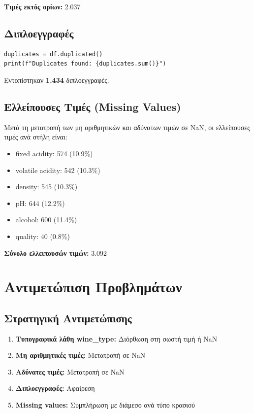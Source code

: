 \documentclass[12pt,a4paper]{article}
\begin{document}
\textbf{Τιμές εκτός ορίων:} 2.037

\subsection{Διπλοεγγραφές}

\begin{lstlisting}
duplicates = df.duplicated()
print(f"Duplicates found: {duplicates.sum()}")
\end{lstlisting}

Εντοπίστηκαν \textbf{1.434} διπλοεγγραφές.

\subsection{Ελλείπουσες Τιμές (Missing Values)}

Μετά τη μετατροπή των μη αριθμητικών και αδύνατων τιμών σε NaN, οι ελλείπουσες τιμές ανά στήλη είναι:

\begin{itemize}
    \item fixed acidity: 574 (10.9\%)
    \item volatile acidity: 542 (10.3\%)
    \item density: 545 (10.3\%)
    \item pH: 644 (12.2\%)
    \item alcohol: 600 (11.4\%)
    \item quality: 40 (0.8\%)
\end{itemize}

\textbf{Σύνολο ελλειπουσών τιμών:} 3.092

\section{Αντιμετώπιση Προβλημάτων}

\subsection{Στρατηγική Αντιμετώπισης}

\begin{enumerate}
    \item \textbf{Τυπογραφικά λάθη wine\_type:} Διόρθωση στη σωστή τιμή ή NaN
    \item \textbf{Μη αριθμητικές τιμές:} Μετατροπή σε NaN
    \item \textbf{Αδύνατες τιμές:} Μετατροπή σε NaN
    \item \textbf{Διπλοεγγραφές:} Αφαίρεση
    \item \textbf{Missing values:} Συμπλήρωση με διάμεσο ανά τύπο κρασιού
\end{enumerate}
\end{document}
